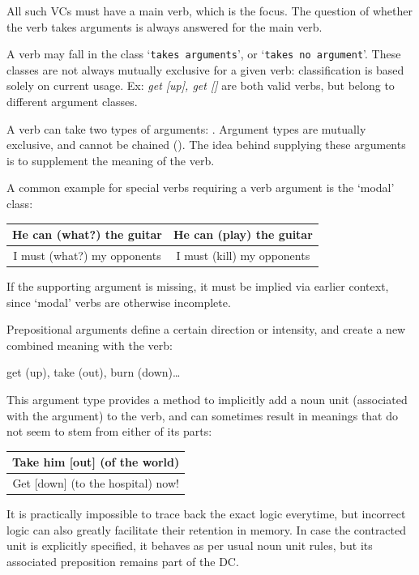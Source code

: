 
All such VCs must have a main verb, which is the focus. The question of whether the verb takes arguments is always answered for the main verb. 

A verb may fall in the class `\texttt{takes arguments}', or `\texttt{takes no argument}'. These classes  are not always mutually exclusive for a given verb:  classification is based solely on  current usage.  Ex: \textit{get [up], get []} are both valid verbs, but belong to different argument classes.

A verb can take two types of arguments: . Argument  types are mutually exclusive, and cannot be chained (). The idea behind supplying these arguments is to supplement the meaning of the verb. 

A common example for special verbs requiring a verb argument is the  `modal' class:
\begin{example}
    \begin{tabular}{c|c}
        He can (what?) the guitar & He can (play) the guitar\\\hline
        I must (what?) my opponents & I must (kill) my opponents
    \end{tabular}
\end{example}
If the supporting argument is missing, it must be implied via earlier context, since  `modal' verbs are otherwise incomplete.

Prepositional arguments define a certain direction or intensity, and create a new combined meaning with the verb: 
\begin{example}
get (up), take (out), burn (down)\ldots
\end{example}
This argument type provides a method to implicitly add a noun unit (associated with the argument) to the verb, and can sometimes result in meanings that do not seem to stem from either of its parts:
\begin{example}
    \begin{tabular}{c}
        Take him  [out] (of the world)\\\hline Get [down] (to the hospital) now!
    \end{tabular}
\end{example}
It is practically impossible to trace back the exact logic everytime, but  incorrect  logic can also greatly facilitate their retention in memory. In case the contracted unit is explicitly specified, it behaves as per  usual  noun unit rules, but  its associated preposition remains part of the DC.

